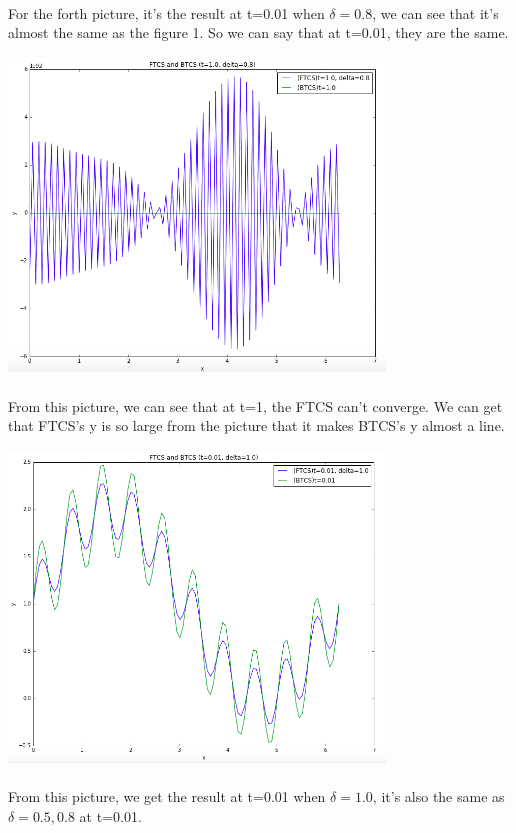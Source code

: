 \documentclass[UTF8]{article}
\begin{document}
\paragraph{}
For the forth picture, it's the result at t=0.01 when $\delta=0.8$, we can see that it's almost the same as the figure 1. So we can say that at t=0.01, they are the same.

\includegraphics[width=10cm]{5.png}

\paragraph{}
From this picture, we can see that at t=1, the FTCS can't converge. We can get that FTCS's y is so large from the picture that it makes BTCS's y almost a line.

\includegraphics[width=10cm]{6.png}

\paragraph{}
From this picture, we get the result at t=0.01 when $\delta = 1.0$, it's also the same as $\delta = 0.5,0.8$ at t=0.01.
\end{document}
